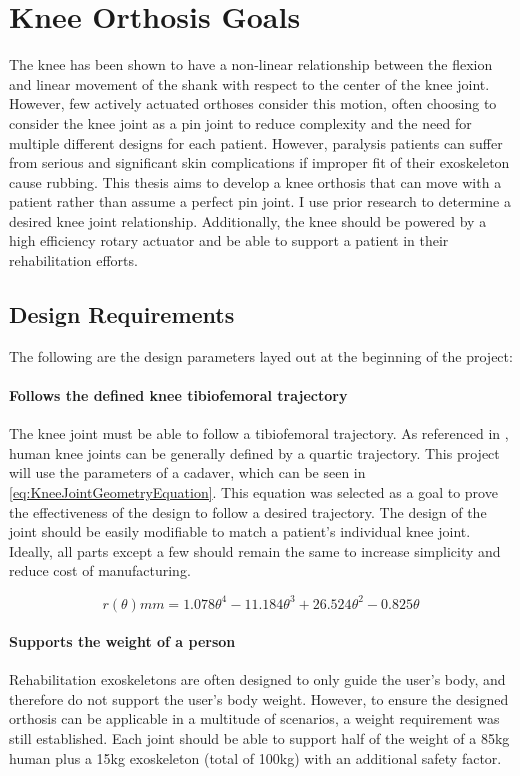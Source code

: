 \chapter{Knee Orthosis Goals}
The knee has been shown to have a non-linear relationship between the flexion and linear movement of the shank with respect to the center of the knee joint. However, few actively actuated orthoses consider this motion, often choosing to consider the knee joint as a pin joint to reduce complexity and the need for multiple different designs for each patient. However, paralysis patients can suffer from serious and significant skin complications if improper fit of their exoskeleton cause rubbing. This thesis aims to develop a knee orthosis that can move with a patient rather than assume a perfect pin joint. I use prior research to determine a desired knee joint relationship. Additionally, the knee should be powered by a high efficiency rotary actuator and be able to support a patient in their rehabilitation efforts.

\section{Design Requirements}
\label{sec:DesignParams}
The following are the design parameters layed out at the beginning of the project:

\subsubsection{Follows the defined knee tibiofemoral trajectory}
The knee joint must be able to follow a tibiofemoral trajectory. As referenced in \cite{KinDynKneeJoint}, human knee joints can be generally defined by a quartic trajectory. This project will use the parameters of a cadaver, which can be seen in \autoref{eq:KneeJointGeometryEquation}. This equation was selected as a goal to prove the effectiveness of the design to follow a desired trajectory. The design of the joint should be easily modifiable to match a patient's individual knee joint. Ideally, all parts except a few should remain the same to increase simplicity and reduce cost of manufacturing.

\begin{equation}
    r(\theta) mm = 1.078\theta^4 - 11.184\theta^3 + 26.524\theta^2 - 0.825\theta
    \label{eq:KneeJointGeometryEquation}
\end{equation}

\subsubsection{Supports the weight of a person}
 Rehabilitation exoskeletons are often designed to only guide the user's body, and therefore do not support the user's body weight. However, to ensure the designed orthosis can be applicable in a multitude of scenarios, a weight requirement was still established. Each joint should be able to support half of the weight of a 85kg human plus a 15kg exoskeleton (total of 100kg) with an additional safety factor.

